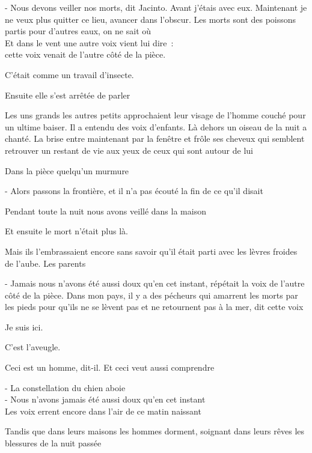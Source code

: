 - Nous devons veiller nos morts, dit Jacinto. Avant j'étais avec eux.
Maintenant je ne veux plus quitter ce lieu, avancer dans l'obscur. Les
morts sont des poissons partis pour d'autres eaux, on ne sait où\\

Et dans le vent une autre voix vient lui dire~:\\

cette voix venait de l'autre côté de la pièce.

C'était comme un travail d'insecte.

Ensuite elle s'est arrêtée de parler

Les uns grands les autres petits approchaient leur visage de l'homme
couché pour un ultime baiser. Il a entendu des voix d'enfants. Là dehors
un oiseau de la nuit a chanté. La brise entre maintenant par la fenêtre
et frôle ses cheveux qui semblent retrouver un restant de vie aux yeux
de ceux qui sont autour de lui

Dans la pièce quelqu'un murmure

- Alors passons la frontière, et il n'a pas écouté la fin de ce qu'il
disait

Pendant toute la nuit nous avons veillé dans la maison

Et ensuite le mort n'était plus là.

Mais ils l'embrassaient encore sans savoir qu'il était parti avec les
lèvres froides de l'aube. Les parents

- Jamais nous n'avons été aussi doux qu'en cet instant, répétait la voix
de l'autre côté de la pièce. Dans mon pays, il y a des pécheurs qui
amarrent les morts par les pieds pour qu'ils ne se lèvent pas et ne
retournent pas à la mer, dit cette voix

\pagebreak

Je suis ici.

C'est l'aveugle.

Ceci est un homme, dit-il. Et ceci veut aussi comprendre

\pagebreak

- La constellation du chien aboie\\

- Nous n'avons jamais été aussi doux qu'en cet instant\\

Les voix errent encore dans l'air de ce matin naissant

Tandis que dans leurs maisons les hommes dorment, soignant dans leurs
rêves les blessures de la nuit passée\\

